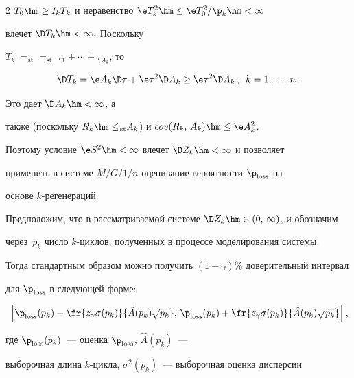 \begin{multicols}{2}
$T_0\hm\ge I_k T_k$ и  неравенство $ \e T_k^2\hm\le \e T_0^2/\p_k\hm<\infty $


влечет $\D T_k\hm<\infty.$ Поскольку


$T_k\;{=}_{\!\mathrm{st}}$\linebreak ${=}_{\!\mathrm{st}}\;\tau_1+\cdots+\tau_{A_k}$, то 


\begin{equation*} 


\D T_k=\e A_k \D \tau + \e \tau^2\D A_k \ge \e \tau^2\D


A_k\,,\enskip k=1,\ldots,n\,. 


\end{equation*} 


Это дает  $\D A_k\hm<\infty$, а


также (поскольку $R_k\hm\le{\!_{\mathrm{st}}} A_k$) и $cov(R_k,\,A_k)\hm\le \e A_k^2$.


Поэтому условие $\e S^2\hm<\infty$ влечет $\D Z_k\hm<\infty$ и позволяет


применить в сис\-те\-ме $M/G/1/n$ оценивание вероятности $\p_{\mathrm{loss}}$ на


основе $k$-ре\-ге\-не\-раций.





Предположим, что в рассматриваемой сис\-те\-ме $\D Z_k\hm\in(0,\,\infty)$, и обозначим


через~$p_k$ чис\-ло  $k$-цик\-лов, полученных в процессе моделирования сис\-те\-мы.


Тогда стандартным образом можно получить $(1-\gamma)\%$ доверительный интервал


для $\p_{\mathrm{loss}}$ в следующей форме: 


\begin{equation}


\hspace*{-1pt}\left[\p_{\mathrm{loss}}(p_k)-\fr{z_{\gamma}\sigma(p_k)}{\hat{A}(p_k)\sqrt{p_k}},


\,\p_{\mathrm{loss}}(p_k)+\fr{z_{\gamma}\sigma(p_k)}{\hat{A}(p_k)\sqrt{p_k}}\right],\!\!


\label{e9-mn}


\end{equation}


 где $\p_{\mathrm{loss}}(p_k)$~--- оценка $\p_{\mathrm{loss}}$, $\hat{A}(p_k)$~---


выборочная длина $k$-цик\-ла, $\sigma^2(p_k)$~--- выборочная оценка дисперсии



\end{multicols}
